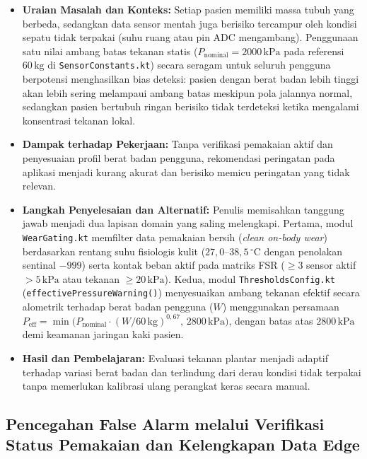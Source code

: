 \begin{itemize}
    \item \textbf{Uraian Masalah dan Konteks:} Setiap pasien memiliki massa tubuh yang berbeda, sedangkan data sensor mentah juga berisiko tercampur oleh kondisi sepatu tidak terpakai (suhu ruang atau pin ADC mengambang). Penggunaan satu nilai ambang batas tekanan statis ($P_{\text{nominal}} = 2000\,\mathrm{kPa}$ pada referensi $60\,\mathrm{kg}$ di \texttt{SensorConstants.kt}) secara seragam untuk seluruh pengguna berpotensi menghasilkan bias deteksi: pasien dengan berat badan lebih tinggi akan lebih sering melampaui ambang batas meskipun pola jalannya normal, sedangkan pasien bertubuh ringan berisiko tidak terdeteksi ketika mengalami konsentrasi tekanan lokal.
    \item \textbf{Dampak terhadap Pekerjaan:} Tanpa verifikasi pemakaian aktif dan penyesuaian profil berat badan pengguna, rekomendasi peringatan pada aplikasi menjadi kurang akurat dan berisiko memicu peringatan yang tidak relevan.
    \item \textbf{Langkah Penyelesaian dan Alternatif:} Penulis memisahkan tanggung jawab menjadi dua lapisan domain yang saling melengkapi. Pertama, modul \texttt{WearGating.kt} memfilter data pemakaian bersih (\textit{clean on-body wear}) berdasarkan rentang suhu fisiologis kulit ($27{,}0\text{--}38{,}5\,^\circ\mathrm{C}$ dengan penolakan sentinal $-999$) serta kontak beban aktif pada matriks FSR ($\ge 3$ sensor aktif $> 5\,\mathrm{kPa}$ atau tekanan $\ge 20\,\mathrm{kPa}$). Kedua, modul \texttt{ThresholdsConfig.kt} (\texttt{effectivePressureWarning()}) menyesuaikan ambang tekanan efektif secara alometrik terhadap berat badan pengguna ($W$) menggunakan persamaan $P_{\text{eff}} = \min\big(P_{\text{nominal}} \cdot (W / 60\,\mathrm{kg})^{0{,}67},\, 2800\,\mathrm{kPa}\big)$, dengan batas atas $2800\,\mathrm{kPa}$ demi keamanan jaringan kaki pasien.
    \item \textbf{Hasil dan Pembelajaran:} Evaluasi tekanan plantar menjadi adaptif terhadap variasi berat badan dan terlindung dari derau kondisi tidak terpakai tanpa memerlukan kalibrasi ulang perangkat keras secara manual.
\end{itemize}

\subsection{Pencegahan False Alarm melalui Verifikasi Status Pemakaian dan Kelengkapan Data Edge}

